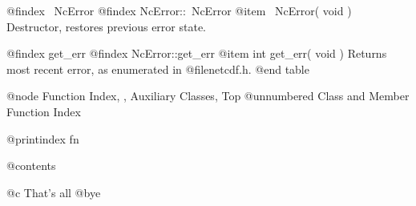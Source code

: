 @findex ~NcError
@findex NcError::~NcError
@item ~NcError( void )
Destructor, restores previous error state.

@findex get_err
@findex NcError::get_err
@item int get_err( void )
Returns most recent error, as enumerated in @file{netcdf.h}.
@end table

@node Function Index,  , Auxiliary Classes, Top
@unnumbered Class and Member Function Index

@printindex fn

@contents

@c That's all
@bye
